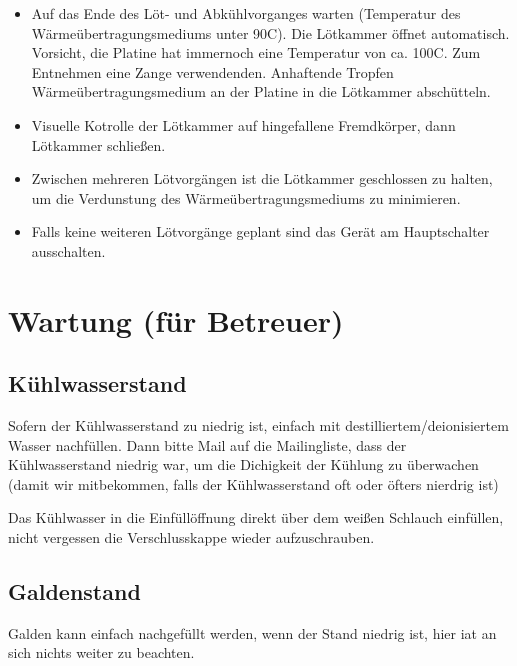 \documentclass{\basedir/fablab-document}
\begin{document}
\begin{itemize}
	\item Auf das Ende des L{\"o}t- und Abk{\"u}hlvorganges warten (Temperatur des W{\"a}rme{\"u}bertragungsmediums unter 90\textdegree C). Die L{\"o}tkammer {\"o}ffnet automatisch. Vorsicht, die Platine hat immernoch eine Temperatur von ca. 100\textdegree C. Zum Entnehmen eine Zange verwendenden. Anhaftende Tropfen W{\"a}rme{\"u}bertragungsmedium an der Platine in die L{\"o}tkammer absch{\"u}tteln.
	\item Visuelle Kotrolle der L{\"o}tkammer auf hingefallene Fremdk{\"o}rper, dann L{\"o}tkammer schlie{\ss}en. 
	\item Zwischen mehreren L{\"o}tvorg{\"a}ngen ist die L{\"o}tkammer geschlossen zu halten, um die Verdunstung des W{\"a}rme{\"u}bertragungsmediums zu minimieren.
	\item Falls keine weiteren L{\"o}tvorg{\"a}nge geplant sind das Ger{\"a}t am Hauptschalter ausschalten. 
	
	\end{itemize}	
	
	\section{Wartung (f{\"u}r Betreuer)}
	
	\subsection{K{\"u}hlwasserstand}
	
	Sofern der K{\"u}hlwasserstand zu niedrig ist, einfach mit destilliertem/deionisiertem Wasser nachf{\"u}llen. Dann bitte Mail auf die Mailingliste, dass der K{\"u}hlwasserstand niedrig war, um die Dichigkeit der K{\"u}hlung zu {\"u}berwachen (damit wir mitbekommen, falls der K{\"u}hlwasserstand oft oder {\"o}fters nierdrig ist)
	
	 Das K{\"u}hlwasser in die Einf{\"u}ll{\"o}ffnung direkt {\"u}ber dem wei{\ss}en Schlauch einf{\"u}llen, nicht vergessen die Verschlusskappe wieder aufzuschrauben.
	
	\subsection{Galdenstand}	
	
	Galden kann einfach nachgef{\"u}llt werden, wenn der Stand niedrig ist, hier iat an sich nichts weiter zu beachten. 
	
	
	\newpage
\end{document}
